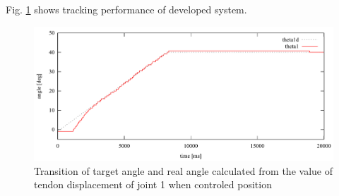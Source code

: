 \documentclass{llncs}
\begin{document}

Fig. \ref{fig:angle_tracking} shows tracking performance of developed system.
\begin{figure}[tb]
	\centering
	\includegraphics[width=.70\textwidth]{./figure/plot/0208_3_0-20.pdf}
	\caption{Transition of target angle and real angle calculated from the value of tendon displacement of joint 1 when controled position}
	\label{fig:angle_tracking}
\end{figure}
\end{document}
